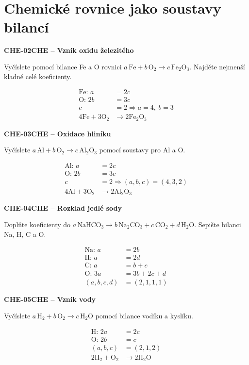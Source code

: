 \documentclass[11pt,a4paper]{article}
\begin{document}
\section{Chemické rovnice jako soustavy bilancí}
\par\medskip\noindent
\textbf{CHE-02}\quad\textbf{CHE -- Vznik oxidu železitého}\par
Vyčíslete pomocí bilance Fe a O rovnici $a\,\mathrm{Fe}+b\,\mathrm{O_2}\rightarrow c\,\mathrm{Fe_2O_3}$. Najděte nejmenší kladné celé koeficienty.
\par\[\begin{aligned}
\text{Fe: }a&=2c\\\text{O: }2b&=3c\\c&=2\Rightarrow a=4,\ b=3\\4\mathrm{Fe}+3\mathrm{O_2}&\rightarrow2\mathrm{Fe_2O_3}
\end{aligned}\]
\par\medskip\noindent
\textbf{CHE-03}\quad\textbf{CHE -- Oxidace hliníku}\par
Vyčíslete $a\,\mathrm{Al}+b\,\mathrm{O_2}\rightarrow c\,\mathrm{Al_2O_3}$ pomocí soustavy pro Al a O.
\par\[\begin{aligned}
\text{Al: }a&=2c\\\text{O: }2b&=3c\\c&=2\Rightarrow (a,b,c)=(4,3,2)\\4\mathrm{Al}+3\mathrm{O_2}&\rightarrow2\mathrm{Al_2O_3}
\end{aligned}\]
\par\medskip\noindent
\textbf{CHE-04}\quad\textbf{CHE -- Rozklad jedlé sody}\par
Doplňte koeficienty do $a\,\mathrm{NaHCO_3}\rightarrow b\,\mathrm{Na_2CO_3}+c\,\mathrm{CO_2}+d\,\mathrm{H_2O}$. Sepište bilanci Na, H, C a O.
\par\[\begin{aligned}
\text{Na: }a&=2b\\\text{H: }a&=2d\\\text{C: }a&=b+c\\\text{O: }3a&=3b+2c+d\\(a,b,c,d)&=(2,1,1,1)
\end{aligned}\]
\par\medskip\noindent
\textbf{CHE-05}\quad\textbf{CHE -- Vznik vody}\par
Vyčíslete $a\,\mathrm{H_2}+b\,\mathrm{O_2}\rightarrow c\,\mathrm{H_2O}$ pomocí bilance vodíku a kyslíku.
\par\[\begin{aligned}
\text{H: }2a&=2c\\\text{O: }2b&=c\\(a,b,c)&=(2,1,2)\\2\mathrm{H_2}+\mathrm{O_2}&\rightarrow2\mathrm{H_2O}
\end{aligned}\]
\end{document}
